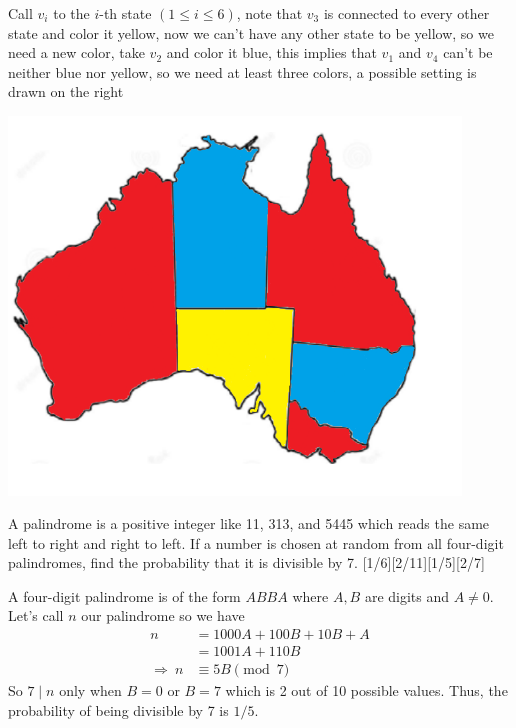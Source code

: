 \documentclass[12pt]{article}
\newcounter{problem}
\begin{document}
\begin{solution}[B]
\begin{minipage}[b][][b]{0.75\linewidth}\vspace{0pt}%
    Call $v_i$ to the $i$-th state $(1\leq i \leq 6)$, note that $v_3$ is connected to every other state and color it yellow, now we can't have any other state to be yellow, so we need a new color, take $v_2$ and color it blue, this implies that $v_1$ and $v_4$ can't be neither blue nor yellow, so we need at least three colors, a possible setting is drawn on the right
\end{minipage}\hfill%
\begin{minipage}[b][][b]{0.2\linewidth}%
  \includegraphics[width=0.9\textwidth]{painted_map.png}
\vspace{3mm}
\end{minipage}
\end{solution}
\vspace{-5mm}

\begin{problem}
   A palindrome is a positive integer like 11, 313, and 5445 which reads the same left to right and right to left. If a number is chosen at random from all four-digit palindromes, find the probability that it is divisible by 7.
   [1/6][2/11][1/5][2/7]
\end{problem}

\begin{solution}[D]
    A four-digit palindrome is of the form $ABBA$ where $A,B$ are digits and $A\neq0$. Let's call $n$ our palindrome so we have
    \begin{align*}
        n &= 1000A+100B+10B+A\\ 
        &= 1001A+110B\\
        \Rightarrow\ n &\equiv 5B \pmod7
    \end{align*}
    So $7\mid n$ only when $B=0$ or $B=7$ which is 2 out of 10 possible values. Thus, the probability of being divisible by 7 is $\boxed{1/5}$. 
\end{solution}
\end{document}
